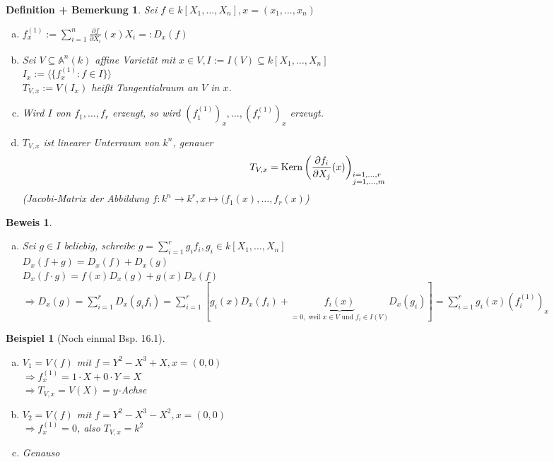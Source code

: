\documentclass[a4paper,12pt]{report}
\theoremstyle{break}
\newtheorem{DefBem}[Def]{Definition + Bemerkung}
\theoremstyle{nonumberbreak}
\newtheorem{nnBsp}{Beispiel}
\newtheorem{Bew}{Beweis}
\theoremstyle{nonumberplain}
\DeclareMathOperator{\Kern}{Kern}
\newcommand{\A}{\mathbb{A}}
\begin{document}
\begin{DefBem}\label{16.3}
Sei $f \in k[X_1,\ldots ,X_n], x=(x_1,\ldots ,x_n)$\begin{enumerate}[a)]
\item
	$f_x^{(1)}:=\sum\limits_{i=1}^n\frac{\partial f}{\partial X_i}(x)X_i =:D_x(f)$
\item
	Sei $V\subseteq \A^n(k)$ affine Variet\"at mit $x\in V, I:=I(V)\subseteq k[X_1,\ldots ,X_n]$\\
	$I_x:=\langle\{f_x^{(1)}:f\in I\}\rangle$\\
	$T_{V,x}:=V(I_x)$ hei\ss t Tangentialraum an $V$ in $x$.
\item
	Wird $I$ von $f_1,\ldots ,f_r$ erzeugt, so wird $(f_1^{(1)})_x,\ldots ,(f_r^{(1)})_x$ erzeugt.
\item\label{16.3d}
	$T_{V,x}$ ist linearer Unterraum von $k^n$, genauer
		\[ T_{V,x}=\Kern\left( \frac{\partial f_i}{\partial X_j}(x) \right)_{\begin{subarray}{l}i=1,\ldots ,r\\j=1,\ldots ,m\end{subarray}}\]
	(Jacobi-Matrix der Abbildung $f:k^n\to k^r, x\mapsto(f_1(x),\ldots ,f_r(x)$)
\end{enumerate}\end{DefBem}

\begin{Bew}\begin{enumerate}[a)]\item[c)]
Sei $g\in I$ beliebig, schreibe $g=\sum\limits_{i=1}^r g_if_i, g_i\in k[X_1,\ldots ,X_n]$\\
$D_x(f+g)=D_x(f)+D_x(g)$\\
$D_x(f\cdot g)=f(x)D_x(g)+g(x)D_x(f)$\\
$\Rightarrow D_x(g)=\sum\limits_{i=1}^rD_x(g_if_i)=\sum\limits_{i=1}^r[g_i(x)D_x(f_i)+\underbrace{f_i(x)}_{=0, \text{ weil }x\in V \text{ und } f_i\in I(V)}D_x(g_i)] = \sum\limits_{i=1}^rg_i(x)(f_i^{(1)})_x$
\end{enumerate}\end{Bew}

\begin{nnBsp}[Noch einmal Bsp. 16.1]\begin{enumerate}[a)]
\item
	$V_1=V(f)$ mit $f=Y^2-X^3+X, x=(0,0)$\\
	$\Rightarrow f_x^{(1)}=1\cdot X+0\cdot Y=X$\\
	$\Rightarrow T_{V,x}=V(X)= y$-Achse
\item
	$V_2=V(f)$ mit $f=Y^2-X^3-X^2, x=(0,0)$\\
	$\Rightarrow f_x^{(1)}=0$, also $T_{V,x}=k^2$
\item
	Genauso
\end{enumerate}\end{nnBsp}
\end{document}
